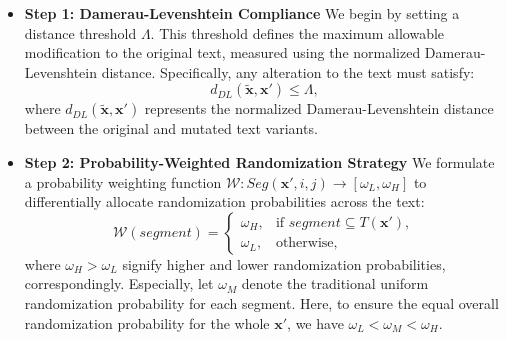 \begin{itemize}[leftmargin=*]
\item \textbf{Step 1: Damerau-Levenshtein Compliance} We begin by setting a distance threshold $\Lambda$. This threshold defines the maximum allowable modification to the original text, measured using the normalized Damerau-Levenshtein distance. Specifically, any alteration to the text must satisfy:
\begin{equation}
d_{DL}(\tilde{\mathbf{x}}, \mathbf{x}') \leq \Lambda,
\end{equation}
where $d_{DL}(\tilde{\mathbf{x}}, \mathbf{x}')$ represents the normalized Damerau-Levenshtein distance between the original and mutated text variants.
\item \textbf{Step 2: Probability-Weighted Randomization Strategy}
We formulate a probability weighting function $\mathcal{W}: Seg(\mathbf{x}',i,j) \rightarrow [\omega_L,\omega_H]$ to differentially allocate randomization probabilities across the text:
\begin{equation}
    \mathcal{W}(segment) = \begin{cases}
        \omega_H, & \text{if } segment \subseteq T(\mathbf{x}'), \\
        \omega_L, & \text{otherwise},
    \end{cases}
\end{equation}
where $\omega_H > \omega_L$ signify higher and lower randomization probabilities, correspondingly. Especially, let $\omega_M$ denote the traditional uniform randomization probability for each segment. Here, to ensure the equal overall randomization probability for the whole $\mathbf{x}'$, we have $\omega_L < \omega_M < \omega_H$.


\end{itemize}
